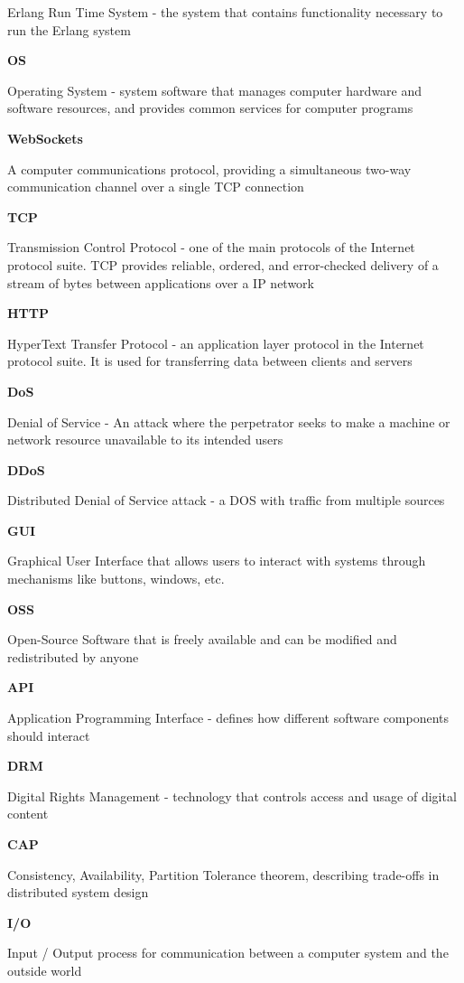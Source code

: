 \documentclass[]{final}
\begin{document}
Erlang Run Time System - the system that contains functionality necessary to run the Erlang system

\textbf{OS}

Operating System - system software that manages computer hardware and software resources, and
provides common services for computer programs

\textbf{WebSockets}

A computer communications protocol, providing a simultaneous two-way communication channel
over a single TCP connection

\textbf{TCP}

Transmission Control Protocol - one of the main protocols of the Internet protocol suite. TCP provides
reliable, ordered, and error-checked delivery of a stream of bytes between applications over a IP network

\textbf{HTTP}

HyperText Transfer Protocol - an application layer protocol in the Internet protocol suite.
It is used for transferring data between clients and servers

\textbf{DoS}

Denial of Service - An attack where the perpetrator seeks to make a machine or network resource unavailable
to its intended users

\textbf{DDoS}

Distributed Denial of Service attack - a DOS with traffic from multiple sources

\textbf{GUI}

Graphical User Interface that allows users to interact with systems through mechanisms like buttons, windows, etc.

\textbf{OSS}

Open-Source Software that is freely available and can be modified and redistributed by anyone

\textbf{API}

Application Programming Interface - defines how different software components should interact

\textbf{DRM}

Digital Rights Management - technology that controls access and usage of digital content

\textbf{CAP}

Consistency, Availability, Partition Tolerance theorem, describing trade-offs in distributed system design

\textbf{I/O}

Input / Output process for communication between a computer system and the outside world
\end{document}
